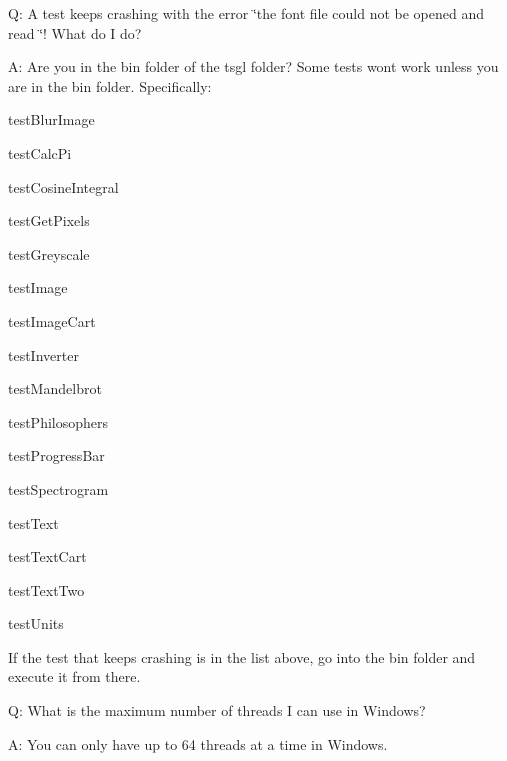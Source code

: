 Q\+: A test keeps crashing with the error \char`\"{}the font file could not be opened and read
\char`\"{}! What do I do?

A\+: Are you in the bin folder of the tsgl folder? Some tests won\textquotesingle{}t work unless you are in the bin folder. Specifically\+:
\begin{DoxyItemize}
\item test\+Blur\+Image
\item test\+Calc\+Pi
\item test\+Cosine\+Integral
\item test\+Get\+Pixels
\item test\+Greyscale
\item test\+Image
\item test\+Image\+Cart
\item test\+Inverter
\item test\+Mandelbrot
\item test\+Philosophers
\item test\+Progress\+Bar
\item test\+Spectrogram
\item test\+Text
\item test\+Text\+Cart
\item test\+Text\+Two
\item test\+Units
\end{DoxyItemize}

If the test that keeps crashing is in the list above, go into the bin folder and execute it from there.

Q\+: What is the maximum number of threads I can use in Windows?

A\+: You can only have up to 64 threads at a time in Windows. 